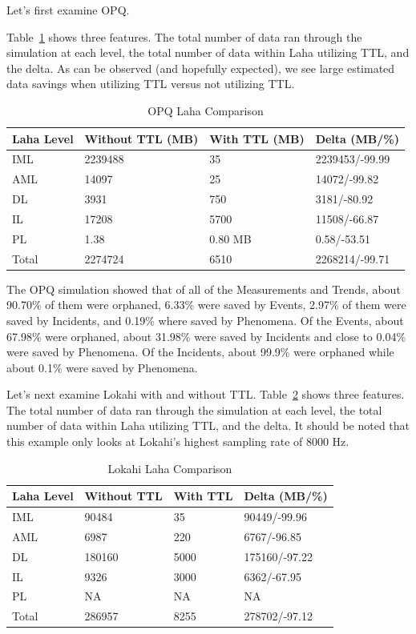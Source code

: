 Let's first examine OPQ\@.

Table~\ref{table:opq_laha_comparison} shows three features. The total number of data ran through the simulation at each level, the total number of data within Laha utilizing TTL, and the delta. As can be observed (and hopefully expected), we see large estimated data savings when utilizing TTL versus not utilizing TTL\@.

\begin{table}[H]
	\centering
	\caption{OPQ Laha Comparison}
	\begin{tabularx}{\textwidth}{Xlll}
		\toprule
		\textbf{Laha Level} & \textbf{Without TTL (MB)} & \textbf{With TTL (MB)} & \textbf{Delta (MB/\%)} \\
		\midrule
		IML & 2239488 & 35 & 2239453/-99.99 \\
		AML & 14097 & 25 & 14072/-99.82\\
		DL & 3931 & 750 & 3181/-80.92 \\
		IL & 17208 & 5700 & 11508/-66.87 \\
		PL & 1.38 & 0.80 MB & 0.58/-53.51 \\
		Total & 2274724 & 6510 & 2268214/-99.71 \\
		\bottomrule
	\end{tabularx}
	\label{table:opq_laha_comparison}
\end{table}

The OPQ simulation showed that of all of the Measurements and Trends, about 90.70\% of them were orphaned, 6.33\% were saved by Events, 2.97\% of them were saved by Incidents, and 0.19\% where saved by Phenomena. Of the Events, about 67.98\% were orphaned, about 31.98\% were saved by Incidents and close to 0.04\% were saved by Phenomena. Of the Incidents, about 99.9\% were orphaned while about 0.1\% were saved by Phenomena.

Let's next examine Lokahi with and without TTL. Table~\ref{table:lokahi_laha_comparison} shows three features. The total number of data ran through the simulation at each level, the total number of data within Laha utilizing TTL, and the delta. It should be noted that this example only looks at Lokahi's highest sampling rate of 8000 Hz.

\begin{table}[H]
	\centering
	\caption{Lokahi Laha Comparison}
	\begin{tabularx}{\textwidth}{Xlll}
		\toprule
		\textbf{Laha Level} & \textbf{Without TTL} & \textbf{With TTL} & \textbf{Delta (MB/\%)} \\
		\midrule
		IML & 90484 & 35 & 90449/-99.96 \\
		AML & 6987 & 220 & 6767/-96.85 \\
		DL & 180160 & 5000 & 175160/-97.22 \\
		IL & 9326 & 3000 & 6362/-67.95 \\
		PL & NA & NA & NA  \\
		Total & 286957 & 8255 & 278702/-97.12 \\
		\bottomrule
	\end{tabularx}
	\label{table:lokahi_laha_comparison}
\end{table}

